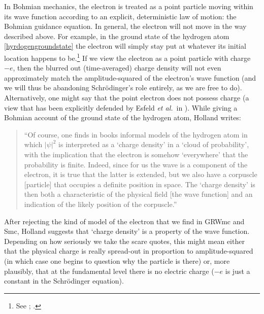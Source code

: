 \documentclass[onecolumn,secnumarabic,amsmath,amssymb,balancelastpage,nofootinbib]{article}
\begin{document}
In Bohmian mechanics, the electron is treated as a point particle moving within its wave function according to an explicit, deterministic law of motion: the Bohmian guidance equation.  In general, the electron will not move in the way described above.  For example, in the ground state of the hydrogen atom \eqref{hyrdogengroundstate} the electron will simply stay put at whatever its initial location happens to be.\footnote{See \cite[pg.\ 153]{holland}; \cite[pg.\ 154]{durrtteufel}.}  If we view the electron as a point particle with charge $-e$, then the blurred out (time-averaged) charge density will not even approximately match the amplitude-squared of the electron's wave function (and we will thus be abandoning Schr\"{o}dinger's role entirely, as we are free to do).  Alternatively, one might say that the point electron does not possess charge (a view that has been explicitly defended by Esfeld \emph{et al.}\ in \cite{esfeld2017, esfeld2018, esfeld2020}).  While giving a Bohmian account of the ground state of the hydrogen atom, Holland writes:
\begin{quote}
``Of course, one finds in books informal models of the hydrogen atom in which $|\psi|^2$ is interpreted as a `charge density' in a `cloud of probability', with the implication that the electron is somehow `everywhere' that the probability is finite. Indeed, since for us the wave is a component of the electron, it is true that the latter is extended, but we also have a corpuscle [particle] that occupies a definite position in space.  The `charge density' is then both a characteristic of the physical field [the wave function] and an indication of the likely position of the corpuscle.'' \cite[pg.\ 155]{holland}
\end{quote}
After rejecting the kind of model of the electron that we find in GRWmc and Smc, Holland suggests that `charge density' is a property of the wave function.  Depending on how seriously we take the scare quotes, this might mean either that the physical charge is really spread-out in proportion to amplitude-squared (in which case one begins to question why the particle is there) or, more plausibly, that at the fundamental level there is no electric charge ($-e$ is just a constant in the Schr\"{o}dinger equation).
\end{document}
